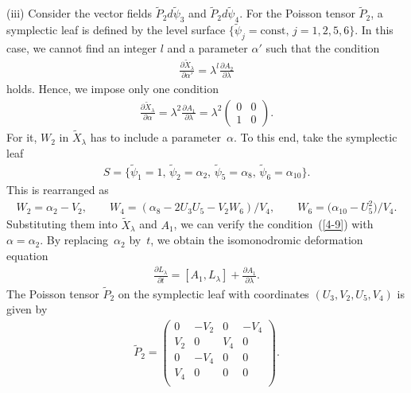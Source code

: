 \documentclass[pdftex]{sigma}
\numberwithin{equation}{section}
\begin{document}
(iii) Consider the vector f\/ields $\widetilde{P}_2 d\widetilde{\psi}_3$ and $\widetilde{P}_2 d\widetilde{\psi}_4$. For the Poisson tensor $\widetilde{P}_2$, a symplectic leaf is def\/ined by the level surface $\{ \widetilde{\psi}_j = \text{const},\, j=1,2,5,6\}$. In this case, we cannot f\/ind an integer $l$ and a parameter $\alpha '$ such that the condition
\begin{gather*}
\frac{\partial \widetilde{X}_\lambda }{\partial \alpha'} = \lambda^l \frac{\partial A_2 }{\partial \lambda }
\end{gather*}
holds. Hence, we impose only one condition
\begin{gather}
\frac{\partial \widetilde{X}_\lambda }{\partial \alpha} = \lambda^2 \frac{\partial A_1 }{\partial \lambda } = \lambda^2 \left(
\begin{matrix}
0 & 0 \\
1 & 0
\end{matrix}
\right).\label{4-9}
\end{gather}
For it, $W_2$ in $\widetilde{X}_\lambda $ has to include a parameter~$\alpha $. To this end, take the symplectic leaf
\begin{gather*}
S = \big\{ \widetilde{\psi}_1 = 1,\, \widetilde{\psi}_2 = \alpha _2 ,\, \widetilde{\psi}_5 = \alpha _{8},\, \widetilde{\psi}_6 = \alpha _{10} \big\}.
\end{gather*}
This is rearranged as
\begin{gather*}
W_2 = \alpha _2 - V_2,\qquad W_4 = (\alpha _8 - 2U_3U_5 - V_2W_6)/V_4,\qquad W_6 = \big(\alpha _{10} - U_5^2\big)/V_4.
\end{gather*}
Substituting them into $\widetilde{X}_\lambda$ and $A_1$, we can verify the condition~(\ref{4-9}) with $\alpha = \alpha _2$. By re\-pla\-cing~$\alpha _2$ by~$t$, we obtain the isomonodromic deformation equation
\begin{gather*}
\frac{\partial L_\lambda }{\partial t} = [A_1, L_\lambda ]+ \frac{\partial A_1}{\partial \lambda } .
\end{gather*}
The Poisson tensor $\widetilde{P}_2$ on the symplectic leaf with coordinates $(U_3, V_2 ,U_5, V_4)$ is given by
\begin{gather*}
\widetilde{P}_2 = \left(
\begin{matrix}
0 &-V_2 &0 & -V_4 \\
V_2 &0 & V_4 &0 \\
0& -V_4 &0 &0 \\
V_4&0 &0 &0 \\
\end{matrix}
\right).
\end{gather*}
\end{document}
